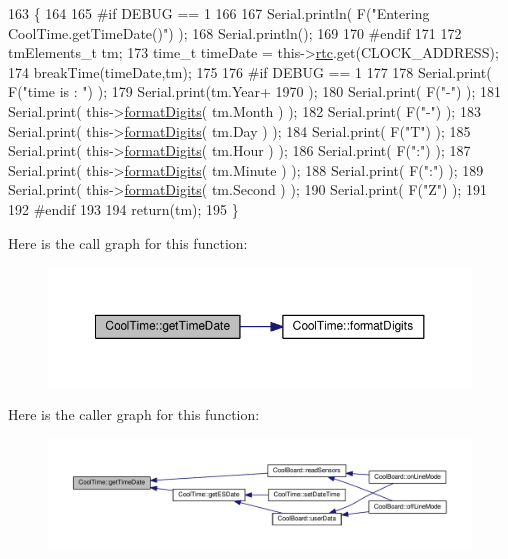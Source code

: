 \begin{DoxyCode}
163 \{
164 
165 \textcolor{preprocessor}{#if DEBUG == 1 }
166     
167     Serial.println( F(\textcolor{stringliteral}{"Entering CoolTime.getTimeDate()"}) );
168     Serial.println();
169 
170 \textcolor{preprocessor}{#endif}
171 
172     tmElements\_t tm;
173     time\_t timeDate = this->\hyperlink{class_cool_time_abd38f2384ff90692b1568d9db869412e}{rtc}.get(CLOCK\_ADDRESS);
174     breakTime(timeDate,tm);
175 
176 \textcolor{preprocessor}{#if DEBUG == 1}
177     
178     Serial.print( F(\textcolor{stringliteral}{"time is : "}) );
179     Serial.print(tm.Year+ 1970 );
180     Serial.print( F(\textcolor{stringliteral}{"-"}) );
181     Serial.print( this->\hyperlink{class_cool_time_acd537cd4210d7bde4e1f5c47d2ac0456}{formatDigits}( tm.Month ) );
182     Serial.print( F(\textcolor{stringliteral}{"-"}) );
183     Serial.print( this->\hyperlink{class_cool_time_acd537cd4210d7bde4e1f5c47d2ac0456}{formatDigits}( tm.Day ) );
184     Serial.print( F(\textcolor{stringliteral}{"T"}) );
185     Serial.print( this->\hyperlink{class_cool_time_acd537cd4210d7bde4e1f5c47d2ac0456}{formatDigits}( tm.Hour ) );
186     Serial.print( F(\textcolor{stringliteral}{":"}) );
187     Serial.print( this->\hyperlink{class_cool_time_acd537cd4210d7bde4e1f5c47d2ac0456}{formatDigits}( tm.Minute ) );
188     Serial.print( F(\textcolor{stringliteral}{":"}) );
189     Serial.print( this->\hyperlink{class_cool_time_acd537cd4210d7bde4e1f5c47d2ac0456}{formatDigits}( tm.Second ) );
190     Serial.print( F(\textcolor{stringliteral}{"Z"}) );
191 
192 \textcolor{preprocessor}{#endif}
193     
194     \textcolor{keywordflow}{return}(tm);
195 \}
\end{DoxyCode}
Here is the call graph for this function\+:\nopagebreak
\begin{figure}[H]
\begin{center}
\leavevmode
\includegraphics[width=350pt]{d6/d49/class_cool_time_a7a7501c5ca77dd1248bea704c44f986c_cgraph}
\end{center}
\end{figure}
Here is the caller graph for this function\+:\nopagebreak
\begin{figure}[H]
\begin{center}
\leavevmode
\includegraphics[width=350pt]{d6/d49/class_cool_time_a7a7501c5ca77dd1248bea704c44f986c_icgraph}
\end{center}
\end{figure}
